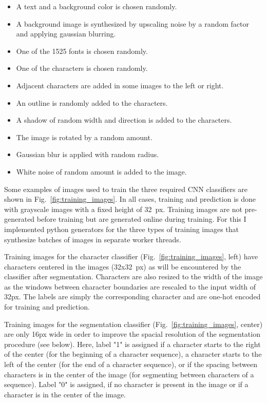 \documentclass[11pt]{article}
\begin{document}
\begin{itemize}
  \itemsep0em
  \item A text and a background color is chosen randomly.
  \item A background image is synthesized by upscaling noise by a random factor and applying gaussian blurring.
  \item One of the 1525 fonts is chosen randomly.
  \item One of the characters is chosen randomly.
  \item Adjacent characters are added in some images to the left or right.
  \item An outline is randomly added to the characters.
  \item A shadow of random width and direction is added to the characters.
  \item The image is rotated by a random amount.
  \item Gaussian blur is applied with random radius.
  \item White noise of random amount is added to the image.
\end{itemize}



Some examples of images used to train the three required CNN classifiers are shown in Fig.~\ref{fig:training_images}.
%
In all cases, training and prediction is done with grayscale images with a fixed height of 32~px.
%
Training images are not pre-generated before training but are generated online during training.
%
For this I implemented python generators for the three types of training images that synthesize
batches of images in separate worker threads.
%


Training images for the character classifier (Fig.~\ref{fig:training_images}, left) have characters centered in the images (32x32~px) as will be encountered
by the classifier after segmentation.
%
Characters are also resized to the width of the image as the windows between character boundaries are rescaled to the
input width of 32px.
%
The labels are simply the corresponding character and are one-hot encoded for training and prediction.


Training images for the segmentation classifier (Fig.~\ref{fig:training_images}, center) are only 16px wide in order to improve the spacial resolution of the segmentation procedure (see below).
%
Here, label "1" is assigned if a character starts to the right of the center (for the beginning of a character sequence),
a character starts to the left of the center (for the end of a character sequence), or if the spacing
between characters is in the center of the image (for segmenting between characters of a sequence).
%
Label "0" is assigned, if no character is present in the image or if a character is in the center of the image.
\end{document}
